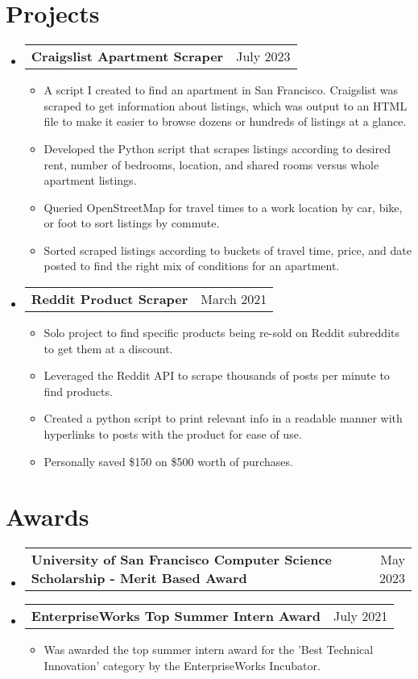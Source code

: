 \documentclass[letterpaper,11pt]{article}
\makeatletter
\newcommand{\resumeItem}[1]{
  \item\small{
    {#1 \vspace{-2pt}}
  }
}
\newcommand{\resumeProjectHeading}[2]{
    \item
    \begin{tabular*}{0.97\textwidth}{l@{\extracolsep{\fill}}r}
      \small#1 & #2 \\
    \end{tabular*}\vspace{-7pt}
}
\newcommand{\resumeSubHeadingListStart}
{\begin{itemize}[leftmargin=0.15in, label={}]}
\newcommand{\resumeSubHeadingListEnd}{\end{itemize}}
\newcommand{\resumeItemListStart}{\begin{itemize}}
\newcommand{\resumeItemListEnd}{\end{itemize}\vspace{-5pt}}
\makeatother
\begin{document}
\section{Projects}
\resumeSubHeadingListStart
\resumeProjectHeading
{\textbf{Craigslist Apartment Scraper} \emph{}}{July 2023}
\resumeItemListStart
\resumeItem{A script I created to find an apartment in San Francisco. Craigslist was scraped to get information about listings, which was output to an HTML file to make it easier to browse dozens or hundreds of listings at a glance.}
\resumeItem{Developed the Python script that scrapes listings according to desired rent, number of bedrooms, location, and shared rooms versus whole apartment listings.}
\resumeItem{Queried OpenStreetMap for travel times to a work location by car, bike, or foot to sort listings by commute.}
\resumeItem{Sorted scraped listings according to buckets of travel time, price, and date posted to find the right mix of conditions for an apartment.}
\resumeItemListEnd
\resumeProjectHeading
{\textbf{Reddit Product Scraper} \emph{}}{March 2021}
\resumeItemListStart
\resumeItem{Solo project to find specific products being re-sold on Reddit subreddits to get them at a discount.}
\resumeItem{Leveraged the Reddit API to scrape thousands of posts per minute to find products. }
\resumeItem{Created a python script to print relevant info in a readable manner with hyperlinks to posts with the product for ease of use. }
\resumeItem{Personally saved \$150 on \$500 worth of purchases.}
\resumeItemListEnd
\resumeSubHeadingListEnd

\section{Awards}
\resumeSubHeadingListStart
\resumeProjectHeading
{\textbf{University of San Francisco Computer Science Scholarship - Merit Based Award} \emph{}}{May 2023}
\resumeProjectHeading
{\textbf{EnterpriseWorks Top Summer Intern Award} \emph{}}{July 2021}
\resumeItemListStart
\resumeItem{Was awarded the top summer intern award for the 'Best Technical Innovation' category by the EnterpriseWorks Incubator.}
\resumeItemListEnd
\resumeSubHeadingListEnd

\end{document}
